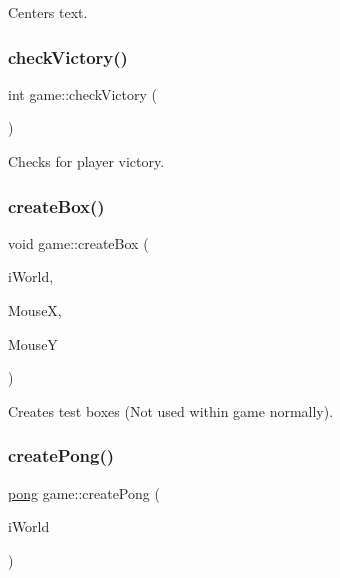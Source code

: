 Centers text. 

\mbox{\label{classgame_a5297f3ca1e18dfc8c4efd718b54b4982}} 
\subsubsection{\texorpdfstring{check\+Victory()}{checkVictory()}}
{\footnotesize\ttfamily int game\+::check\+Victory (\begin{DoxyParamCaption}{ }\end{DoxyParamCaption})}



Checks for player victory. 

\mbox{\label{classgame_a8d6319c1da22e9d41292feb3091bf562}} 
\subsubsection{\texorpdfstring{create\+Box()}{createBox()}}
{\footnotesize\ttfamily void game\+::create\+Box (\begin{DoxyParamCaption}\item[{b2\+World \&}]{i\+World,  }\item[{int}]{MouseX,  }\item[{int}]{MouseY }\end{DoxyParamCaption})}



Creates test boxes (Not used within game normally). 

\mbox{\label{classgame_a0f2725bdacb5162d7570a04cf8648490}} 
\subsubsection{\texorpdfstring{create\+Pong()}{createPong()}}
{\footnotesize\ttfamily \hyperlink{classpong}{pong} game\+::create\+Pong (\begin{DoxyParamCaption}\item[{b2\+World \&}]{i\+World }\end{DoxyParamCaption})}



